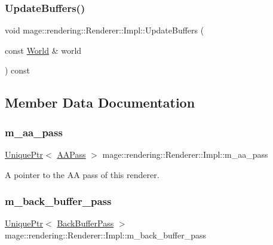 \subsubsection{\texorpdfstring{Update\+Buffers()}{UpdateBuffers()}}
{\footnotesize\ttfamily void mage\+::rendering\+::\+Renderer\+::\+Impl\+::\+Update\+Buffers (\begin{DoxyParamCaption}\item[{const \hyperlink{classmage_1_1rendering_1_1_world}{World} \&}]{world }\end{DoxyParamCaption}) const\hspace{0.3cm}{\ttfamily [private]}}



\subsection{Member Data Documentation}
\hypertarget{classmage_1_1rendering_1_1_renderer_1_1_impl_aeb6351e4bacece7f3682685d74593d18}{}\label{classmage_1_1rendering_1_1_renderer_1_1_impl_aeb6351e4bacece7f3682685d74593d18} 
\subsubsection{\texorpdfstring{m\+\_\+aa\+\_\+pass}{m\_aa\_pass}}
{\footnotesize\ttfamily \hyperlink{namespacemage_a3316d7143a973e37adf1110f2e80ca31}{Unique\+Ptr}$<$ \hyperlink{classmage_1_1rendering_1_1_a_a_pass}{A\+A\+Pass} $>$ mage\+::rendering\+::\+Renderer\+::\+Impl\+::m\+\_\+aa\+\_\+pass\hspace{0.3cm}{\ttfamily [private]}}

A pointer to the AA pass of this renderer. \hypertarget{classmage_1_1rendering_1_1_renderer_1_1_impl_aa030ca4a6167a0dead99172e922ae724}{}\label{classmage_1_1rendering_1_1_renderer_1_1_impl_aa030ca4a6167a0dead99172e922ae724} 
\subsubsection{\texorpdfstring{m\+\_\+back\+\_\+buffer\+\_\+pass}{m\_back\_buffer\_pass}}
{\footnotesize\ttfamily \hyperlink{namespacemage_a3316d7143a973e37adf1110f2e80ca31}{Unique\+Ptr}$<$ \hyperlink{classmage_1_1rendering_1_1_back_buffer_pass}{Back\+Buffer\+Pass} $>$ mage\+::rendering\+::\+Renderer\+::\+Impl\+::m\+\_\+back\+\_\+buffer\+\_\+pass\hspace{0.3cm}{\ttfamily [private]}}

